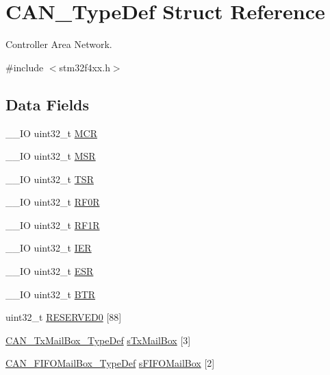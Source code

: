 \hypertarget{struct_c_a_n___type_def}{\section{C\-A\-N\-\_\-\-Type\-Def Struct Reference}
\label{struct_c_a_n___type_def}
}


Controller Area Network.  




{\ttfamily \#include $<$stm32f4xx.\-h$>$}

\subsection*{Data Fields}
\begin{DoxyCompactItemize}
\item 
\-\_\-\-\_\-\-I\-O uint32\-\_\-t \hyperlink{struct_c_a_n___type_def_a27af4e9f888f0b7b1e8da7e002d98798}{M\-C\-R}
\item 
\-\_\-\-\_\-\-I\-O uint32\-\_\-t \hyperlink{struct_c_a_n___type_def_acdd4c1b5466be103fb2bb2a225b1d3a9}{M\-S\-R}
\item 
\-\_\-\-\_\-\-I\-O uint32\-\_\-t \hyperlink{struct_c_a_n___type_def_a87e3001757a0cd493785f1f3337dd0e8}{T\-S\-R}
\item 
\-\_\-\-\_\-\-I\-O uint32\-\_\-t \hyperlink{struct_c_a_n___type_def_accf4141cee239380d0ad4634ee21dbf6}{R\-F0\-R}
\item 
\-\_\-\-\_\-\-I\-O uint32\-\_\-t \hyperlink{struct_c_a_n___type_def_a02b589bb589df4f39e549dca4d5abb08}{R\-F1\-R}
\item 
\-\_\-\-\_\-\-I\-O uint32\-\_\-t \hyperlink{struct_c_a_n___type_def_a6566f8cfbd1d8aa7e8db046aa35e77db}{I\-E\-R}
\item 
\-\_\-\-\_\-\-I\-O uint32\-\_\-t \hyperlink{struct_c_a_n___type_def_a2b39f943954e0e7d177b511d9074a0b7}{E\-S\-R}
\item 
\-\_\-\-\_\-\-I\-O uint32\-\_\-t \hyperlink{struct_c_a_n___type_def_a5c0fcd3e7b4c59ab1dd68f6bd8f74e07}{B\-T\-R}
\item 
uint32\-\_\-t \hyperlink{struct_c_a_n___type_def_aae28ab86a4ae57ed057ed1ea89a6d34b}{R\-E\-S\-E\-R\-V\-E\-D0} \mbox{[}88\mbox{]}
\item 
\hyperlink{struct_c_a_n___tx_mail_box___type_def}{C\-A\-N\-\_\-\-Tx\-Mail\-Box\-\_\-\-Type\-Def} \hyperlink{struct_c_a_n___type_def_ae37503ab1a7bbd29846f94cdadf0a9ef}{s\-Tx\-Mail\-Box} \mbox{[}3\mbox{]}
\item 
\hyperlink{struct_c_a_n___f_i_f_o_mail_box___type_def}{C\-A\-N\-\_\-\-F\-I\-F\-O\-Mail\-Box\-\_\-\-Type\-Def} \hyperlink{struct_c_a_n___type_def_a21b030b34e131f7ef6ea273416449fe4}{s\-F\-I\-F\-O\-Mail\-Box} \mbox{[}2\mbox{]}

\end{DoxyCompactItemize}
